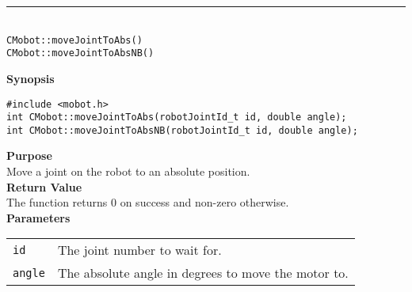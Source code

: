 \noindent
\vspace{5pt}
\rule{4.5in}{0.015in}\\
\noindent
{\LARGE \texttt{CMobot::moveJointToAbs()}}\\
{\LARGE \texttt{CMobot::moveJointToAbsNB()}}\\
{}

\noindent
{\bf Synopsis}
\vspace{-8pt}
\begin{verbatim}
#include <mobot.h>
int CMobot::moveJointToAbs(robotJointId_t id, double angle);
int CMobot::moveJointToAbsNB(robotJointId_t id, double angle);
\end{verbatim}

\noindent
{\bf Purpose}\\
Move a joint on the robot to an absolute position.\\

\noindent
{\bf Return Value}\\
The function returns 0 on success and non-zero otherwise.\\

\noindent
{\bf Parameters}\\
\vspace{-0.1in}
\begin{description}
\item               
\begin{tabular}{p{10 mm}p{145 mm}}
\texttt{id} & The joint number to wait for. \\
\texttt{angle} & The absolute angle in degrees to move the motor to.  \\
\end{tabular}
\end{description}

